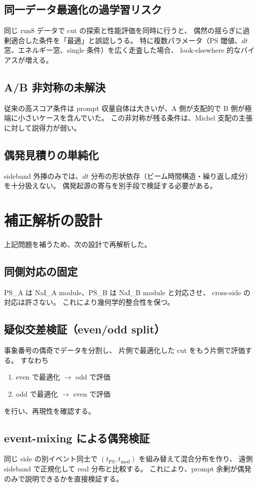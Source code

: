 \documentclass[a4paper,11pt]{jsarticle}
\begin{document}
\subsection{同一データ最適化の過学習リスク}
同じ run8 データで cut の探索と性能評価を同時に行うと、
偶然の揺らぎに過剰適合した条件を「最適」と誤認しうる。
特に複数パラメータ（PS 閾値、$dt$ 窓、エネルギー窓、single 条件）を広く走査した場合、
look-elsewhere 的なバイアスが増える。

\subsection{A/B 非対称の未解決}
従来の高スコア条件は prompt 収量自体は大きいが、A 側が支配的で B 側が極端に小さいケースを含んでいた。
この非対称が残る条件は、Michel 支配の主張に対して説得力が弱い。

\subsection{偶発見積りの単純化}
sideband 外挿のみでは、$dt$ 分布の形状依存（ビーム時間構造・繰り返し成分）を十分扱えない。
偶発起源の寄与を別手段で検証する必要がある。

\section{補正解析の設計}
上記問題を補うため、次の設計で再解析した。

\subsection{同側対応の固定}
PS\_A は NaI\_A module、PS\_B は NaI\_B module と対応させ、
cross-side の対応は許さない。
これにより幾何学的整合性を保つ。

\subsection{疑似交差検証（even/odd split）}
事象番号の偶奇でデータを分割し、
片側で最適化した cut をもう片側で評価する。
すなわち
\begin{enumerate}
  \item even で最適化 $\to$ odd で評価
  \item odd で最適化 $\to$ even で評価
\end{enumerate}
を行い、再現性を確認する。

\subsection{event-mixing による偶発検証}
同じ side の別イベント同士で $(t_{\mathrm{PS}}, t_{\mathrm{mod}})$ を組み替えて混合分布を作り、
遠側 sideband で正規化して real 分布と比較する。
これにより、prompt 余剰が偶発のみで説明できるかを直接検証する。
\end{document}
